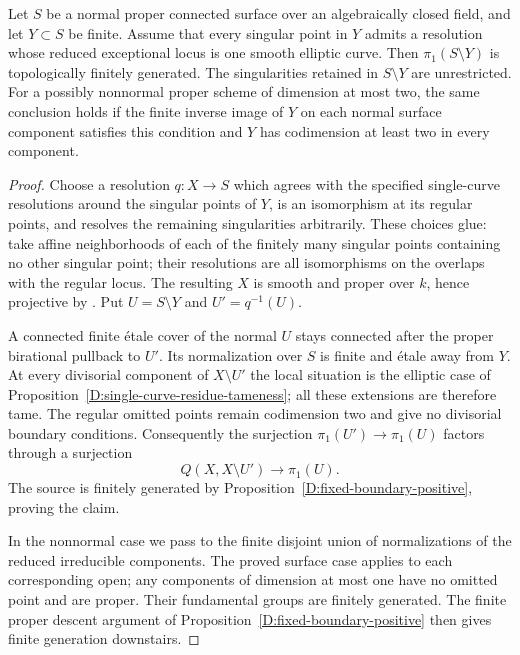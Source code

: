 \begin{corollary}
\label{D:elliptic-surface-boundary}
Let $S$ be a normal proper connected surface over an algebraically
closed field, and let $Y\subset S$ be finite.  Assume that every
singular point in $Y$ admits a resolution whose reduced exceptional
locus is one smooth elliptic curve.  Then
$\pi_1(S\setminus Y)$ is topologically finitely generated.
The singularities retained in $S\setminus Y$ are unrestricted.
For a possibly nonnormal proper scheme of dimension at most two,
the same conclusion holds if the finite inverse image of $Y$ on
each normal surface component satisfies this condition and $Y$
has codimension at least two in every component.
\end{corollary}
\begin{proof}
Choose a resolution $q:X\to S$ which agrees with the specified
single-curve resolutions around the singular points of $Y$, is an
isomorphism at its regular points, and resolves the remaining
singularities arbitrarily.  These choices glue: take affine
neighborhoods of each of the finitely many singular points
containing no other singular point; their resolutions are all
isomorphisms on the overlaps with the regular locus.
The resulting $X$ is smooth and proper over $k$, hence projective
by \cite[Lemma 54.16.11, tag 0C5P]{StacksDSurfaceResolution}.
Put $U=S\setminus Y$ and $U'=q^{-1}(U)$.

A connected finite \'etale cover of the normal $U$ stays connected
after the proper birational pullback to $U'$.  Its normalization
over $S$ is finite and \'etale away from $Y$.  At every divisorial
component of $X\setminus U'$ the local situation is the elliptic
case of Proposition~\ref{D:single-curve-residue-tameness}; all these
extensions are therefore tame.  The regular omitted points remain
codimension two and give no divisorial boundary conditions.
Consequently the surjection $\pi_1(U')\to\pi_1(U)$ factors
through a surjection
\[
              Q(X,X\setminus U')\longrightarrow\pi_1(U).
\]
The source is finitely generated by
Proposition~\ref{D:fixed-boundary-positive}, proving the claim.

In the nonnormal case we pass to the finite disjoint union of
normalizations of the reduced irreducible components.  The proved
surface case applies to each corresponding open; any components
of dimension at most one have no omitted point and are proper.
Their fundamental groups are finitely generated.  The finite
proper descent argument of Proposition~\ref{D:fixed-boundary-positive}
then gives finite generation downstairs.
\end{proof}
